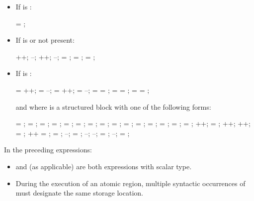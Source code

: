 \begin{ccppspecific}
\begin{itemize}
\item If  is :
\begin{ompSyntax}
 = ;
\end{ompSyntax}

\item If  is  or not present:
\begin{ompSyntax}
++;
--;
++;
--;
 = ;
 =   ;
 =   ;
\end{ompSyntax}

\item If  is :
\begin{ompSyntax}
 = ++;
 = --;
 = ++;
 = --;
 =  = ;
 =  =   ;
 =  =   ;
\end{ompSyntax}

and where  is a structured block with one of the following forms:

\begin{ompSyntax}
 = ;  = ;
 = ;  = ;
 = ;  =   ;
 = ;  =   ;
 =   ;  = ;
 =   ;  = ;
 = ;  = ;
 = ; ++;
 = ; ++;
++;  = ;
++\code{;}  = ;
 = ; --;
 = ; --;
--;  = ;
--;  = ;
\end{ompSyntax}
\end{itemize}

In the preceding expressions:

\begin{itemize}
\item {} and  (as applicable) are both  expressions with scalar type.

\item During the execution of an atomic region, multiple syntactic occurrences of  must
designate the same storage location.


\end{itemize}
\end{ccppspecific}
